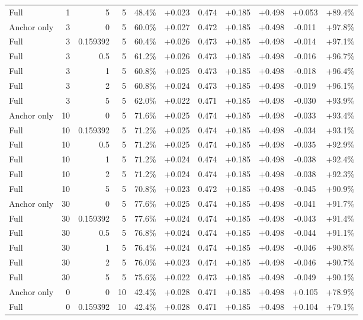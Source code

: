 \begin{table}[htbp]
\begin{tabular}{lrrrccccccc}
Full & 1 & 5 & 5 & 48.4\% & +0.023 & 0.474 & +0.185 & +0.498 & +0.053 & +89.4\% \\
Anchor only & 3 & 0 & 5 & 60.0\% & +0.027 & 0.472 & +0.185 & +0.498 & -0.011 & +97.8\% \\
Full & 3 & 0.159392 & 5 & 60.4\% & +0.026 & 0.473 & +0.185 & +0.498 & -0.014 & +97.1\% \\
Full & 3 & 0.5 & 5 & 61.2\% & +0.026 & 0.473 & +0.185 & +0.498 & -0.016 & +96.7\% \\
Full & 3 & 1 & 5 & 60.8\% & +0.025 & 0.473 & +0.185 & +0.498 & -0.018 & +96.4\% \\
Full & 3 & 2 & 5 & 60.8\% & +0.024 & 0.473 & +0.185 & +0.498 & -0.019 & +96.1\% \\
Full & 3 & 5 & 5 & 62.0\% & +0.022 & 0.471 & +0.185 & +0.498 & -0.030 & +93.9\% \\
Anchor only & 10 & 0 & 5 & 71.6\% & +0.025 & 0.474 & +0.185 & +0.498 & -0.033 & +93.4\% \\
Full & 10 & 0.159392 & 5 & 71.2\% & +0.025 & 0.474 & +0.185 & +0.498 & -0.034 & +93.1\% \\
Full & 10 & 0.5 & 5 & 71.2\% & +0.025 & 0.474 & +0.185 & +0.498 & -0.035 & +92.9\% \\
Full & 10 & 1 & 5 & 71.2\% & +0.024 & 0.474 & +0.185 & +0.498 & -0.038 & +92.4\% \\
Full & 10 & 2 & 5 & 71.2\% & +0.024 & 0.474 & +0.185 & +0.498 & -0.038 & +92.3\% \\
Full & 10 & 5 & 5 & 70.8\% & +0.023 & 0.472 & +0.185 & +0.498 & -0.045 & +90.9\% \\
Anchor only & 30 & 0 & 5 & 77.6\% & +0.025 & 0.474 & +0.185 & +0.498 & -0.041 & +91.7\% \\
Full & 30 & 0.159392 & 5 & 77.6\% & +0.024 & 0.474 & +0.185 & +0.498 & -0.043 & +91.4\% \\
Full & 30 & 0.5 & 5 & 76.8\% & +0.024 & 0.474 & +0.185 & +0.498 & -0.044 & +91.1\% \\
Full & 30 & 1 & 5 & 76.4\% & +0.024 & 0.474 & +0.185 & +0.498 & -0.046 & +90.8\% \\
Full & 30 & 2 & 5 & 76.0\% & +0.023 & 0.474 & +0.185 & +0.498 & -0.046 & +90.7\% \\
Full & 30 & 5 & 5 & 75.6\% & +0.022 & 0.473 & +0.185 & +0.498 & -0.049 & +90.1\% \\
Anchor only & 0 & 0 & 10 & 42.4\% & +0.028 & 0.471 & +0.185 & +0.498 & +0.105 & +78.9\% \\
Full & 0 & 0.159392 & 10 & 42.4\% & +0.028 & 0.471 & +0.185 & +0.498 & +0.104 & +79.1\% \\

\end{tabular}
\end{table}
